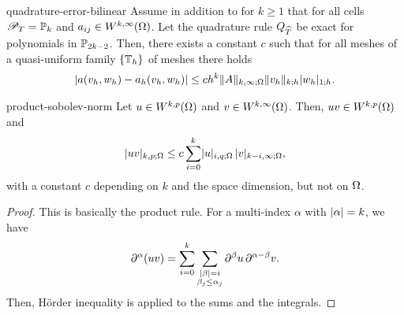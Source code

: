 \begin{Theorem}{quadrature-error-bilinear}
  Assume in addition to
   for $k\ge1$ that
  for all cells $\shapespace_\cell = \P_k$ and $a_{ij}\in
  W^{k,\infty}(\domain)$.
  Let the quadrature rule $Q_{\refcell}$ be exact for polynomials in
  $\P_{2k-2}$.  Then, there exists a constant $c$ such that for all
  meshes of a quasi-uniform family $\{\mesh_h\}$ of meshes there holds
  \begin{gather}
    \abs{a(v_h, w_h) - a_h(v_h, w_h)} \le c h^k \norm{A}_{k,\infty;\domain}
    \norm{v_h}_{k;h} \snorm{w_h}_{1;h}.
  \end{gather}
\end{Theorem}

\begin{Lemma}{product-sobolev-norm}
  Let $u\in W^{k,p}(\domain)$ and $v\in W^{k,\infty}(\domain)$. Then,
  $uv\in W^{k,p}(\domain)$ and
  \begin{gather}
    \snorm{uv}_{k,p;\domain}
    \le c \sum_{i=0}^{k} \snorm{u}_{i,q;\domain}\,
    \snorm{v}_{k-i,\infty;\domain},
  \end{gather}
  with a constant $c$ depending on $k$ and the space dimension, but
  not on $\domain$.
\end{Lemma}

\begin{proof}
  This is basically the product rule. For a multi-index $\alpha$ with
  $\abs{\alpha} = k$, we have
  \begin{gather*}
    \d^{\alpha}(uv) = \sum_{i=0}^k
    \sum_{\substack{\abs{\beta}=i\\\beta_j\le \alpha_j}} \d^{\beta}u\,\d^{\alpha-\beta} v.
  \end{gather*}
  Then, Hörder inequality is applied to the sums and the integrals.
\end{proof}

